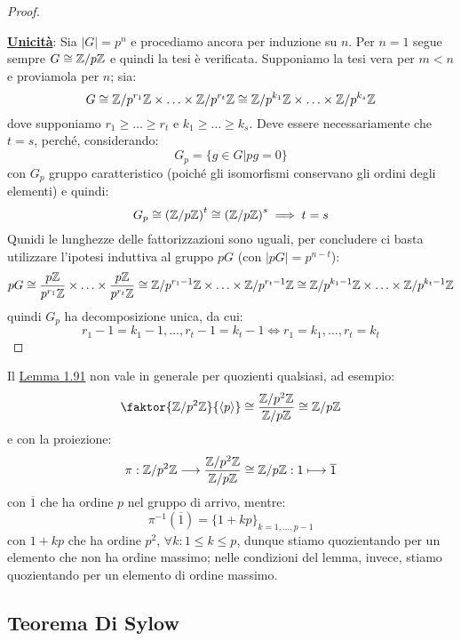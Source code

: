 \documentclass[11pt]{scrartcl}
\begin{document}
\begin{proof}
\begin{itemize}
    \end{itemize}
\underline{\textbf{Unicità}}: Sia $|G| = p^n$ e procediamo ancora per induzione su $n$. Per $n = 1$ segue sempre $G \cong {\mathbb Z}/p{\mathbb Z}$ e quindi la tesi è verificata. Supponiamo la tesi vera per $m<n$ e proviamola per $n$; sia:
        \[ G \cong \mathbb{Z}/{p^{r_1}}\mathbb{Z} \times \ldots \times \mathbb{Z}/{p^{r_t}}\mathbb{Z} \cong \mathbb{Z}/{p^{k_1}}\mathbb{Z} \times \ldots \times \mathbb{Z}/{p^{k_s}}\mathbb{Z}
            \]
        dove supponiamo $r_1 \geq \ldots \geq r_t$ e $k_1 \geq \ldots \geq k_s$. Deve essere necessariamente che $t = s$, perché, considerando:
            \[ G_p = \{g \in G | pg = 0\}
                \]
        con $G_p$ gruppo caratteristico (poiché gli isomorfismi conservano gli ordini degli elementi) e quindi:
            \[ G_p \cong \left({\mathbb Z}/p{\mathbb Z}\right)^t \cong \left({\mathbb Z}/p{\mathbb Z}\right)^s \implies t = s
                \]
        Qunidi le lunghezze delle fattorizzazioni sono uguali, per concludere ci basta utilizzare l'ipotesi induttiva al gruppo $pG$ (con $|pG| = p^{n-t}$):
            \[ pG \cong \frac{p\mathbb Z}{p^{r_1}\mathbb Z} \times \ldots \times \frac{p\mathbb Z}{p^{r_t}\mathbb Z} \cong \mathbb{Z}/{p^{r_1-1}}\mathbb{Z} \times \ldots \times \mathbb{Z}/{p^{r_t-1}}\mathbb{Z} \cong \mathbb{Z}/{p^{k_1-1}}\mathbb{Z} \times \ldots \times \mathbb{Z}/{p^{k_t-1}}\mathbb{Z}
                \]
        quindi $G_p$ ha decomposizione unica, da cui:
            \[ r_1 - 1 = k_1 -1, \ldots, r_t - 1 = k_t - 1 \iff r_1 = k_1, \ldots , r_t = k_t
                \]
\end{proof}

\begin{remark}
    Il \hyperref[l:1.91]{Lemma 1.91} non vale in generale per quozienti qualsiasi, ad esempio:
        \[ \faktor{\Z{p^2}}{\left<p\right>} \cong \frac{\Z{p^2}}{\Zp}\cong \Zp
            \]
    e con la proiezione:
        \[ \pi: \mathbb{Z}/{p^2}\mathbb{Z} \longrightarrow \frac{\mathbb{Z}/{p^2}\mathbb{Z}}{{\mathbb Z}/p{\mathbb Z}} \cong {\mathbb Z}/p{\mathbb Z} : 1 \longmapsto \overline 1
            \]
    con $\overline 1$ che ha ordine $p$ nel gruppo di arrivo, mentre:
        \[ \pi^{-1}(\overline 1) = \{1 + kp\}_{k = 1,\ldots,p-1}
            \]
    con $1+kp$ che ha ordine $p^2$, $\forall k : 1 \leq k \leq p$, dunque stiamo quozientando per un elemento che non ha ordine massimo;
     nelle condizioni del lemma, invece, stiamo quozientando per un elemento di ordine massimo.
\end{remark}


\newpage
\subsection{Teorema Di Sylow}
\end{document}
